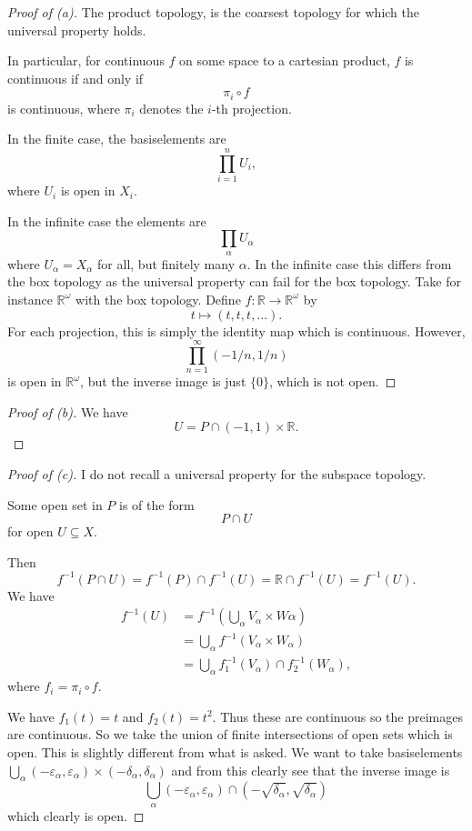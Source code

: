 \documentclass[11pt]{article}
\begin{document}
\begin{proof}[Proof of (a)]
    The product topology, is the coarsest 
    topology for which the universal property holds. 

    In particular, for continuous $f$ 
    on some space to a cartesian product, $f$ is continuous 
    if and only if 
    \[
        \pi_i \circ f 
    \]
    is continuous, where $\pi_i$ denotes the $i$-th projection. 

    In the finite case, the basiselements are 
    \[
        \prod_{i=1}^n U_i, 
    \]
    where $U_i$ is open in $X_i$. 
    
    In the infinite case the elements are 
    \[
        \prod_\alpha U_\alpha 
    \]
    where $U_\alpha = X_\alpha$ for all, but finitely many 
    $\alpha$. In the infinite case this differs from the 
    box topology as the universal property can fail 
    for the box topology. Take for instance 
    $\mathbb R^\omega$ with the box topology. 
    Define $f : \mathbb R \to \mathbb R^\omega$ by 
    \[
        t\mapsto (t,t,t,\ldots).
    \] 
    For each projection, this is simply the identity map 
    which is continuous. However, 
    \[
        \prod_{n=1}^\infty (-1/n, 1/n) 
    \]
    is open in $\mathbb R^\omega$, but 
    the inverse image is just $\{0\}$, which is not 
    open. 

\end{proof} 
\begin{proof}[Proof of (b)]
    We have 
    \[
        U = P \cap (-1,1) \times \mathbb R. 
    \]
\end{proof}
\begin{proof}[Proof of (c)]
    I do not recall a universal property for the 
    subspace topology. 

    Some open set in $P$ is of the form 
    \[
        P \cap U 
    \]
    for open $U \subseteq X$. 

    Then 
    \[
        f^{-1}(P \cap U) 
        = f^{-1}(P) \cap f^{-1}(U) 
        = \mathbb R \cap f^{-1}(U) 
        = f^{-1}(U).
    \]
    We have 
    \begin{align*}
        f^{-1}(U) 
        &= f^{-1}\left(\bigcup_\alpha V_\alpha \times 
        W \alpha\right) \\ 
        &= \bigcup_\alpha f^{-1}(V_\alpha \times W_\alpha) \\ 
        &= \bigcup_{\alpha} f_1^{-1}(V_\alpha) 
        \cap f_2^{-1}(W_\alpha),  
    \end{align*}
    where $f_i = \pi_i \circ f$. 

    We have $f_1(t) = t$ and 
    $f_2(t) = t^2$. 
    Thus these are continuous so the preimages 
    are continuous. So we take the union of 
    finite intersections of open sets which is open. 
    This is slightly different from what is asked. 
    We want to take basiselements 
    $\bigcup_\alpha (-\varepsilon_\alpha, \varepsilon_\alpha) 
    \times (-\delta_\alpha, \delta_\alpha)$ and 
    from this clearly see that the inverse image is 
    \[
        \bigcup_\alpha (-\varepsilon_\alpha, 
        \varepsilon_\alpha) \cap (-\sqrt{\delta_\alpha}, 
        \sqrt{\delta_\alpha})
    \]
    which clearly is open. 
\end{proof}
\end{document}
